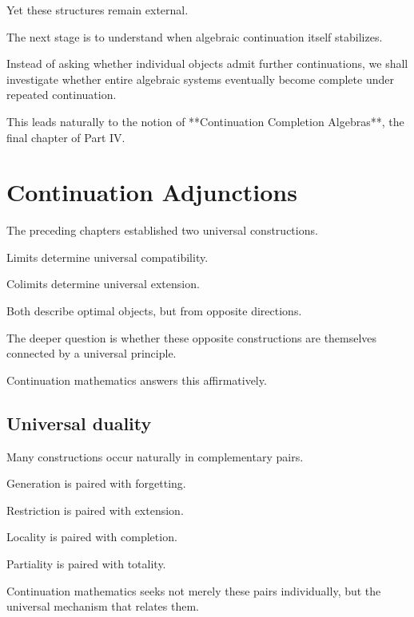 \documentclass[13pt,openany]{book}
\theoremstyle{plain}
\theoremstyle{definition}
\begin{document}
Yet these structures remain external.

The next stage is to understand when algebraic continuation itself stabilizes.

Instead of asking whether individual objects admit further continuations, we
shall investigate whether entire algebraic systems eventually become complete
under repeated continuation.

This leads naturally to the notion of **Continuation Completion Algebras**, the
final chapter of Part IV.


\chapter{Continuation Adjunctions}

The preceding chapters established two universal constructions.

Limits determine universal compatibility.

Colimits determine universal extension.

Both describe optimal objects, but from opposite directions.

The deeper question is whether these opposite constructions are themselves
connected by a universal principle.

Continuation mathematics answers this affirmatively.

\section{Universal duality}

Many constructions occur naturally in complementary pairs.

Generation is paired with forgetting.

Restriction is paired with extension.

Locality is paired with completion.

Partiality is paired with totality.

Continuation mathematics seeks not merely these pairs individually, but the
universal mechanism that relates them.

\end{document}

